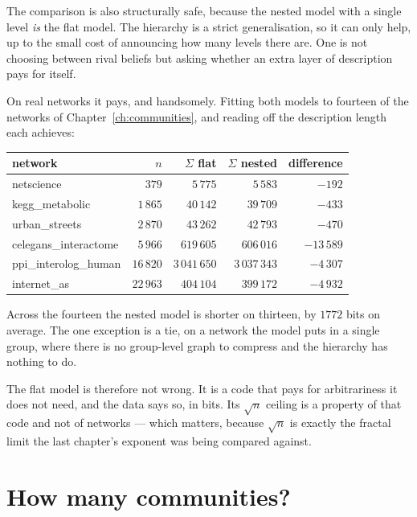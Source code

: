 The comparison is also structurally safe, because the nested model with a single
level \emph{is} the flat model. The hierarchy is a strict generalisation, so it
can only help, up to the small cost of announcing how many levels there are. One
is not choosing between rival beliefs but asking whether an extra layer of
description pays for itself.

On real networks it pays, and handsomely. Fitting both models to fourteen of the
networks of Chapter~\ref{ch:communities}, and reading off the description length
each achieves:

\begin{center}
\small
\begin{tabular}{lrrrr}
\hline
network & $n$ & $\Sigma$ flat & $\Sigma$ nested & difference\\
\hline
netscience              & $379$    & $5\,775$     & $5\,583$     & $-192$\\
kegg\_metabolic         & $1\,865$ & $40\,142$    & $39\,709$    & $-433$\\
urban\_streets          & $2\,870$ & $43\,262$    & $42\,793$    & $-470$\\
celegans\_interactome   & $5\,966$ & $619\,605$   & $606\,016$   & $-13\,589$\\
ppi\_interolog\_human   & $16\,820$& $3\,041\,650$& $3\,037\,343$& $-4\,307$\\
internet\_as            & $22\,963$& $404\,104$   & $399\,172$   & $-4\,932$\\
\hline
\end{tabular}
\end{center}

\noindent Across the fourteen the nested model is shorter on thirteen, by $1772$
bits on average. The one exception is a tie, on a network the model puts in a
single group, where there is no group-level graph to compress and the hierarchy
has nothing to do.

The flat model is therefore not wrong. It is a code that pays for arbitrariness it
does not need, and the data says so, in bits. Its $\sqrt n$ ceiling is a property
of that code and not of networks --- which matters, because $\sqrt n$ is exactly
the fractal limit the last chapter's exponent was being compared against.

\section{How many communities?}
\label{sec:gr-howmanyagain}

